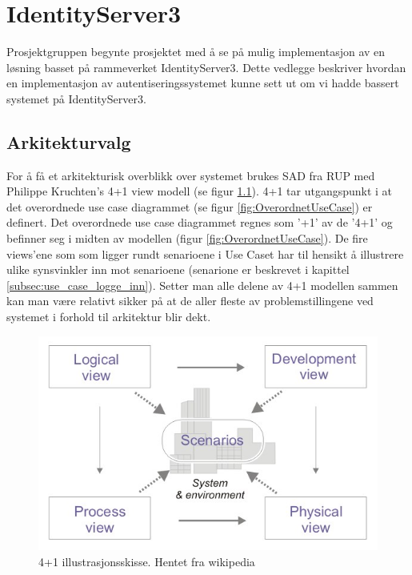 \chapter{IdentityServer3}
\label{chap:IdentityServer3}
Prosjektgruppen begynte prosjektet med å se på mulig implementasjon av en løsning basset på rammeverket IdentityServer3. Dette vedlegge beskriver hvordan en implementasjon av autentiseringssystemet kunne sett ut om vi hadde bassert systemet på IdentityServer3.

\section*{Arkitekturvalg}
\label{sec:identityServer3_arkitekturvalg}
For å få et arkitekturisk overblikk over systemet brukes SAD fra RUP med Philippe Kruchten’s 4+1 view modell (se figur \ref{fig:4+1illustrasjonssikkse}). 4+1 tar utgangspunkt i at det overordnede use case diagrammet (se figur \ref{fig:OverordnetUseCase}) er definert. Det overordnede use case diagrammet regnes som '+1' av de '4+1' og befinner seg i midten av modellen (figur \ref{fig:OverordnetUseCase}). De fire views'ene som som ligger rundt senarioene i Use Caset har til hensikt å illustrere ulike synsvinkler inn mot senarioene (senarione er beskrevet i kapittel \ref{subsec:use_case_logge_inn}). Setter man alle delene av 4+1 modellen sammen kan man være relativt sikker på at de aller fleste av problemstillingene ved systemet i forhold til arkitektur blir dekt. 

\begin{figure}[H]
    \centering
    \includegraphics[scale=0.50]{graphics/04-arkitektur/4+1_Architectural_View_Model.jpg}
    \caption{4+1 illustrasjonsskisse. Hentet fra wikipedia}
    \label{fig:4+1illustrasjonssikkse}
\end{figure}

